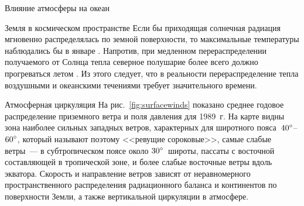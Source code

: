\begin{chapter}{Влияние атмосферы на океан}
\begin{section}{Земля в космическом пространстве}
Если бы приходящая солнечная радиация мгновенно распределялась по
земной поверхности, то максимальные температуры наблюдались бы в
январе%
. 
Напротив, при медленном перераспределении получаемого от Солнца тепла северное
полушарие более всего должно прогреваться летом%
. 
Из этого следует, что в
реальности перераспределение тепла воздушными и океанскими течениями
требует значительного времени.
%
\end{section}

\begin{section}{Атмосферная циркуляция}
На рис.~\ref{fig:surfacewinds} показано среднее годовое распределение 
приземного ветра и поля давления для 1989~г. На карте видны зона наиболее 
сильных западных ветров, характерных для широтного 
пояса~${40}^\circ$--${60}^\circ$,
который называют поэтому <<ревущие сороковые>>, самые слабые ветры~--- в
субтропическом поясе около ${30}^\circ$~широты, пассаты с восточной
составляющей в тропической зоне, и более слабые восточные ветры вдоль
экватора. Скорость и направление ветров зависят от неравномерного 
пространственного распределения радиационного баланса и континентов 
по поверхности Земли, а также вертикальной циркуляции в атмосфере.
%


\end{section}
\end{chapter}
